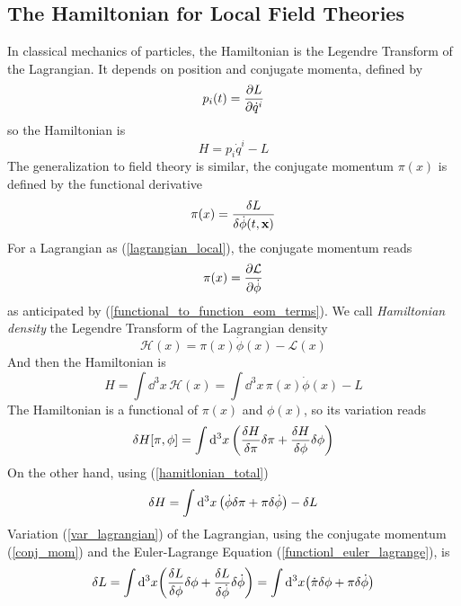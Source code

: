 \subsection{The Hamiltonian for Local Field Theories}
In classical mechanics of particles, the Hamiltonian is the Legendre Transform of the Lagrangian. It depends on position and conjugate momenta, defined by
\begin{equation}
    p_i(t)=\pdv{L}{\dot{q}^i}
\end{equation}
so the Hamiltonian is 
\begin{equation}
    H= p_i\dot{q}^i-L
\end{equation}
The generalization to field theory is similar, the conjugate momentum $\pi(x)$ is defined by the functional derivative
\begin{equation}
    \pi(x)=\fdv{L}{\dot{\phi}(t,\vb{x})}
\end{equation}
For a Lagrangian as (\ref{lagrangian_local}), the conjugate momentum reads
\begin{equation}
    \pi(x)=\pdv{\mathcal{L}}{\dot{\phi}}
    \label{conj_mom}
\end{equation}
as anticipated by (\ref{functional_to_function_eom_terms}). We call \textit{Hamiltonian density} the Legendre Transform of the Lagrangian density 
\begin{equation}
    \mathcal{H}(x)=\pi(x)\dot{\phi}(x)-\mathcal{L}(x)
    \label{hamiltonian_density}
\end{equation}
And then the Hamiltonian is 
\begin{equation}
    H=\int\dd^3x\,\mathcal{H}(x)=\int\dd^3x\,\pi(x)\dot{\phi}(x)-L
    \label{hamitlonian_total}
\end{equation}
The Hamiltonian is a functional of $\pi(x)$ and $\phi(x)$, so its variation reads
\begin{equation}
    \delta H[\pi,\phi]=\int\dd^3x\,\qty(\fdv{H}{\pi}\delta\pi+\fdv{H}{\phi}\delta\phi)
    \label{var_H1}
\end{equation}
On the other hand, using (\ref{hamitlonian_total})
\begin{equation}
    \delta H=\int\dd^3x\,\qty(\dot{\phi}\delta\pi+\pi\delta\dot{\phi})-\delta L
    \label{var_H2}
\end{equation}
Variation (\ref{var_lagrangian}) of the Lagrangian, using the conjugate momentum (\ref{conj_mom}) and the Euler-Lagrange Equation (\ref{functionl_euler_lagrange}), is
\begin{equation}
    \delta L =\int\dd^3x \qty(\fdv{L}{\phi}\delta\phi+\fdv{L}{\dot{\phi}}\delta\dot{\phi})=\int\dd^3x\qty(\dot{\pi}\delta\phi+\pi\delta\dot{\phi})
\end{equation}
